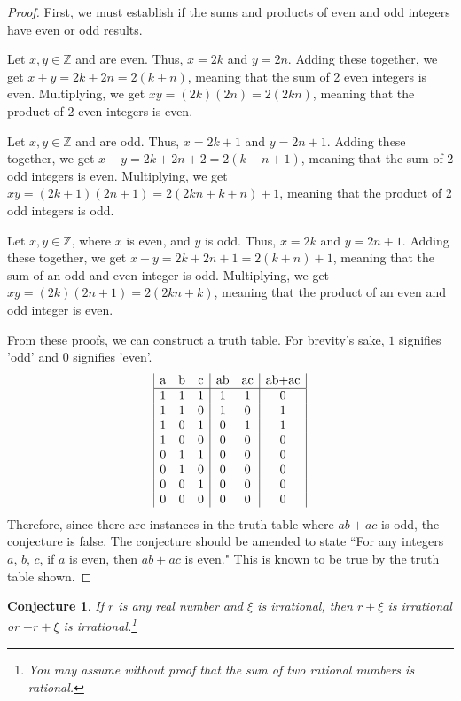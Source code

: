 \documentclass[11pt,titlepage]{article}		%
\def\Z{{\mathbb Z}}
\theoremstyle{theorem}
\newtheorem{conjecture}[theorem]{Conjecture}
\begin{document}
\begin{proof}
First, we must establish if the sums and products of even and odd integers have even or odd results. 

Let $x,y \in \Z$ and are even. Thus, $x = 2k$ and $y =2n$. Adding these together, we get $x+y = 2k + 2n = 2(k +n)$, meaning that the sum of 2 even integers is even. Multiplying, we get $xy=(2k)(2n)=2(2kn)$, meaning that the product of 2 even integers is even.

Let $x,y \in \Z$ and are odd. Thus, $x=2k+1$ and $y=2n+1$. Adding these together, we get $x+y = 2k+2n+2=2(k+n+1)$, meaning that the sum of 2 odd integers is even. Multiplying, we get $xy = (2k+1)(2n+1) = 2(2kn +k +n) + 1$, meaning that the product of 2 odd integers is odd.

Let $x,y \in \Z$, where $x$ is even, and $y$ is odd. Thus, $x=2k$ and $y=2n+1$. Adding these together, we get $x+y=2k+2n+1 = 2(k+n)+1$, meaning that the sum of an odd and even integer is odd. Multiplying, we get $xy=(2k)(2n+1)=2(2kn+k)$, meaning that the product of an even and odd integer is even.

From these proofs, we can construct a truth table. For brevity's sake, $1$ signifies 'odd' and $0$ signifies 'even'.
\begin{displaymath}
\begin{array}{|c c c| c c| c|}
$a$ & $b$ & $c$ & $ab$ & $ac$ & $ab+ac$\\
\hline
1 & 1 & 1 & 1 & 1 & 0\\
1 & 1 & 0 & 1 & 0 & 1\\
1 & 0 & 1 & 0 & 1 & 1\\
1 & 0 & 0 & 0 & 0 & 0\\
0 & 1 & 1 & 0 & 0 & 0\\
0 & 1 & 0 & 0 & 0 & 0\\
0 & 0 & 1 & 0 & 0 & 0\\
0 & 0 & 0 & 0 & 0 & 0
\end{array}
\end{displaymath}
Therefore, since there are instances in the truth table where $ab+ac$ is odd, the conjecture is false. The conjecture should be amended to state ``For any integers $a$, $b$, $c$, if $a$ is even, then $ab+ac$ is even." This is known to be true by the truth table shown.
\end{proof}

\clearpage

\begin{conjecture}
    If $r$ is any real number and $\xi$ is irrational, then $r + \xi$ is irrational or $-r + \xi$ is irrational.\footnote{You may assume without proof that the sum of two rational numbers is rational.}
\end{conjecture}
\end{document}
